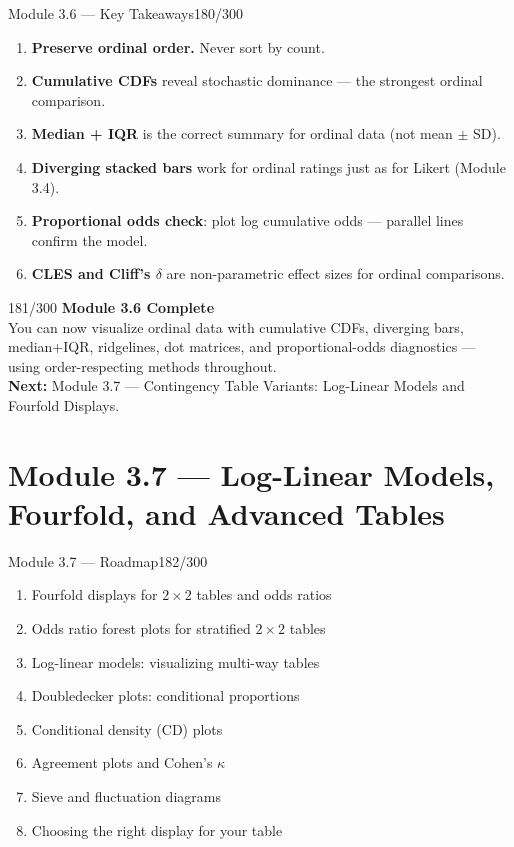 \documentclass[10pt]{beamer}
\newcommand{\smark}[1]{\hfill{\scriptsize\color{codegray}#1}}
\begin{document}
\begin{frame}{Module 3.6 --- Key Takeaways}\smark{180/300}
\begin{enumerate}
    \item \textbf{Preserve ordinal order.} Never sort by count.
    \item \textbf{Cumulative CDFs} reveal stochastic dominance --- the strongest ordinal comparison.
    \item \textbf{Median + IQR} is the correct summary for ordinal data (not mean $\pm$ SD).
    \item \textbf{Diverging stacked bars} work for ordinal ratings just as for Likert (Module 3.4).
    \item \textbf{Proportional odds check}: plot log cumulative odds --- parallel lines confirm the model.
    \item \textbf{CLES and Cliff's $\delta$} are non-parametric effect sizes for ordinal comparisons.
\end{enumerate}
\end{frame}

\begin{frame}{}\smark{181/300}
\centering\vspace{1.5cm}
{\Large\textbf{Module 3.6 Complete}}\\[0.5cm]
You can now visualize ordinal data with cumulative CDFs, diverging bars, median+IQR, ridgelines, dot matrices, and proportional-odds diagnostics --- using order-respecting methods throughout.\\[0.5cm]
\textbf{Next:} Module 3.7 --- Contingency Table Variants: Log-Linear Models and Fourfold Displays.
\end{frame}

\section{Module 3.7 --- Log-Linear Models, Fourfold, and Advanced Tables}

\begin{frame}{Module 3.7 --- Roadmap}\smark{182/300}
\begin{enumerate}
    \item Fourfold displays for $2 \times 2$ tables and odds ratios
    \item Odds ratio forest plots for stratified $2 \times 2$ tables
    \item Log-linear models: visualizing multi-way tables
    \item Doubledecker plots: conditional proportions
    \item Conditional density (CD) plots
    \item Agreement plots and Cohen's $\kappa$
    \item Sieve and fluctuation diagrams
    \item Choosing the right display for your table
\end{enumerate}
\end{frame}
\end{document}
